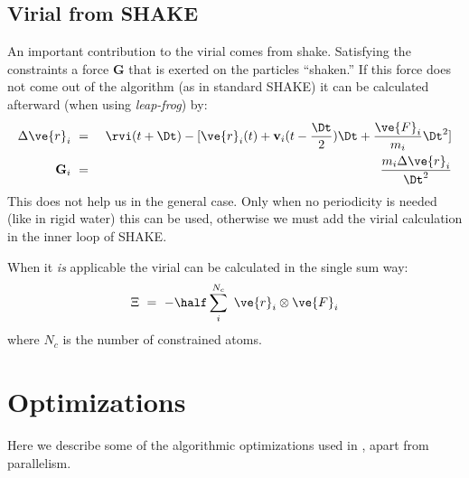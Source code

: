 \subsection{Virial from SHAKE}
An important contribution to the virial comes from shake. Satisfying 
the constraints a force {\bf G} that is exerted on the particles ``shaken.'' If this
force does not come out of the algorithm (as in standard SHAKE) it can be
calculated afterward (when using {\em leap-frog}) by:
\begin{eqnarray}
\Delta\ve{r}_i&~=~&\rvi(t+\Dt)-
[\ve{r}_i(t)+{\bf v}_i(t-\frac{\Dt}{2})\Dt+\frac{\ve{F}_i}{m_i}\Dt^2]	\\
{\bf G}_i&~=~&\frac{m_i\Delta\ve{r}_i}{\Dt^2}
\end{eqnarray}
This does not help us in the general case. Only when no periodicity
is needed (like in rigid water) this can be used, otherwise
we must add the virial calculation in the inner loop of SHAKE.

When it {\em is} applicable the virial can be calculated in the single sum way:
\begin{equation}
\Xi~=~-\half\sum_i^{N_c}~\ve{r}_i\otimes\ve{F}_i
\end{equation}
where $N_c$ is the number of constrained atoms.




\section{Optimizations}
Here we describe some of the algorithmic optimizations used 
in {\gromacs}, apart from parallelism. 


